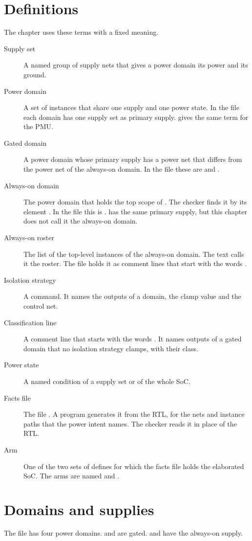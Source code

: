 \section{Definitions}\label{ds:ch:power-intent:definitions}
The chapter uses these terms with a fixed meaning.
\begin{description}
  \item[Supply set] A named group of supply nets that gives a power domain its power and its ground.
  \item[Power domain] A set of instances that share one supply and one power state. In the file each domain has one supply set as primary supply.  gives the same term for the PMU.
  \item[Gated domain] A power domain whose primary supply has a power net that differs from the power net of the always-on domain. In the file these are  and .
  \item[Always-on domain] The power domain that holds the top scope of . The checker finds it by its element . In the file this is .  has the same primary supply, but this chapter does not call it the always-on domain.
  \item[Always-on roster] The list of the top-level instances of the always-on domain. The text calls it the roster. The file holds it as comment lines that start with the words .
  \item[Isolation strategy] A  command. It names the outputs of a domain, the clamp value and the control net.
  \item[Classification line] A comment line that starts with the words . It names outputs of a gated domain that no isolation strategy clamps, with their class.
  \item[Power state] A named condition of a supply set or of the whole SoC.
  \item[Facts file] The file . A program generates it from the RTL, for the nets and instance paths that the power intent names. The checker reads it in place of the RTL.
  \item[Arm] One of the two sets of defines for which the facts file holds the elaborated SoC. The arms are named  and .
\end{description}

\section{Domains and supplies}\label{ds:ch:power-intent:domains}
The file has four power domains.  and  are gated.  and  have the always-on supply.

